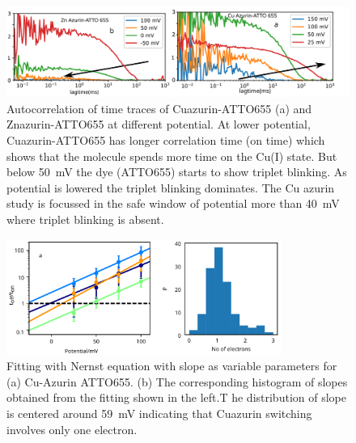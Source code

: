\begin{figure}
  \centering
  \includegraphics[width=\textwidth]{fcs_comparision}
  \makeatletter
  \renewcommand{\fnum@figure}{\figurename~S\thefigure}
  \makeatother
  \caption{Autocorrelation of time traces of Cuazurin-ATTO655 (a) and Znazurin-ATTO655 at different potential. 
  At lower potential, Cuazurin-ATTO655 has longer correlation time (on time) which shows that the molecule spends more time on the Cu(I) state.
  But below \SI{50}{\mV} the dye (ATTO655) starts to show triplet blinking.
  As potential is lowered the triplet blinking dominates.
  The Cu azurin study is focussed in the safe window of potential more than \SI{40}{\mV} where triplet blinking is absent.}
  \label{SIfig:fcscomparision}
\end{figure}
\squeezeup
\begin{figure}
  \centering
  \includegraphics[width=0.8\textwidth]{SI_potential_slope}
  \makeatletter
  \renewcommand{\fnum@figure}{\figurename~S\thefigure}
  \makeatother
  \caption{Fitting with Nernst equation with slope as variable parameters for  (a) Cu-Azurin ATTO655. 
  (b) The corresponding histogram of slopes obtained from the fitting shown in the left.T
  he distribution of slope is centered around \SI{59}{\mV} indicating that Cuazurin switching  involves only one electron.}
  \label{SIfig:potential_slope}
\end{figure}
\squeezeup
